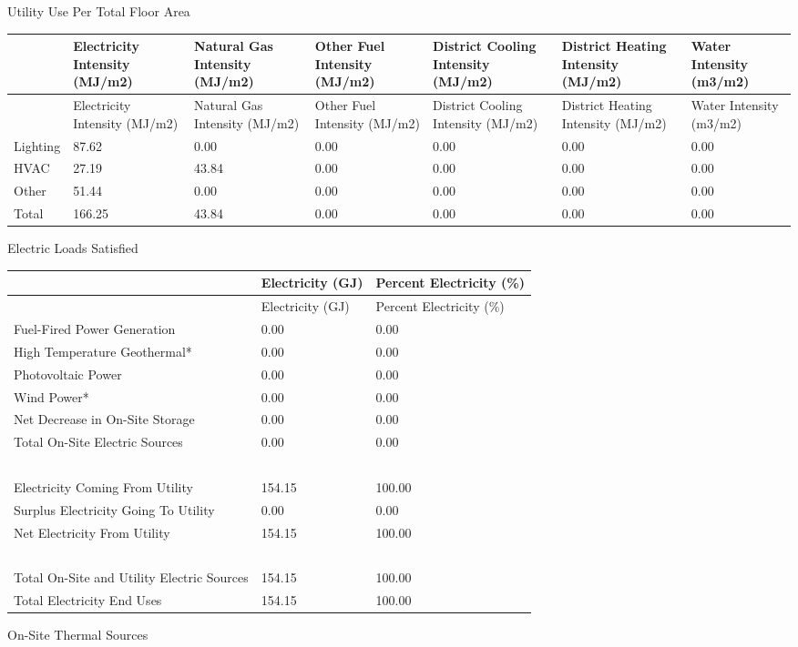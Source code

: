 Utility Use Per Total Floor Area

\begin{longtable}[c]{>{\raggedright}p{0.85in}>{\raggedright}p{0.85in}>{\raggedright}p{0.85in}>{\raggedright}p{0.85in}>{\raggedright}p{0.85in}>{\raggedright}p{0.85in}>{\raggedright}p{0.85in}}
\toprule 
~ & Electricity Intensity (MJ/m2) & Natural Gas Intensity (MJ/m2) & Other Fuel Intensity (MJ/m2) & District Cooling Intensity (MJ/m2) & District Heating Intensity (MJ/m2) & Water Intensity (m3/m2) \tabularnewline
\midrule
\endfirsthead

\toprule 
~ & Electricity Intensity (MJ/m2) & Natural Gas Intensity (MJ/m2) & Other Fuel Intensity (MJ/m2) & District Cooling Intensity (MJ/m2) & District Heating Intensity (MJ/m2) & Water Intensity (m3/m2) \tabularnewline
\midrule
\endhead

Lighting & 87.62 & 0.00 & 0.00 & 0.00 & 0.00 & 0.00 \tabularnewline
HVAC & 27.19 & 43.84 & 0.00 & 0.00 & 0.00 & 0.00 \tabularnewline
Other & 51.44 & 0.00 & 0.00 & 0.00 & 0.00 & 0.00 \tabularnewline
Total & 166.25 & 43.84 & 0.00 & 0.00 & 0.00 & 0.00 \tabularnewline
\bottomrule
\end{longtable}

Electric Loads Satisfied

\begin{longtable}[c]{>{\raggedright}p{2.9in}>{\raggedright}p{1.5in}>{\raggedright}p{1.59in}}
\toprule 
~ & Electricity (GJ) & Percent Electricity (\%) \tabularnewline
\midrule
\endfirsthead

\toprule 
~ & Electricity (GJ) & Percent Electricity (\%) \tabularnewline
\midrule
\endhead

Fuel-Fired Power Generation & 0.00 & 0.00 \tabularnewline
High Temperature Geothermal* & 0.00 & 0.00 \tabularnewline
Photovoltaic Power & 0.00 & 0.00 \tabularnewline
Wind Power* & 0.00 & 0.00 \tabularnewline
Net Decrease in On-Site Storage & 0.00 & 0.00 \tabularnewline
Total On-Site Electric Sources & 0.00 & 0.00 \tabularnewline
~ & ~ & ~ \tabularnewline
Electricity Coming From Utility & 154.15 & 100.00 \tabularnewline
Surplus Electricity Going To Utility & 0.00 & 0.00 \tabularnewline
Net Electricity From Utility & 154.15 & 100.00 \tabularnewline
~ & ~ & ~ \tabularnewline
Total On-Site and Utility Electric Sources & 154.15 & 100.00 \tabularnewline
Total Electricity End Uses & 154.15 & 100.00 \tabularnewline
\bottomrule
\end{longtable}

On-Site Thermal Sources

